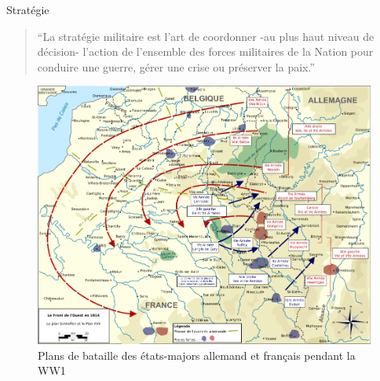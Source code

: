 \documentclass{article}
\begin{document}
Stratégie \cite{military_strategy}
\begin{quote}“La stratégie militaire est l'art de coordonner -au plus haut niveau de décision- l'action de l'ensemble des forces militaires de la Nation pour conduire une guerre, gérer une crise ou préserver la paix.”\end{quote}
\begin{figure}[H]
	\begin{centering}
	\includegraphics[width=\linewidth]{../ressources/strategy_ww1}
	\caption{Plans de bataille des états-majors allemand et français pendant la WW1 \cite{ww1}}
	\end{centering}
\end{figure}
\end{document}
